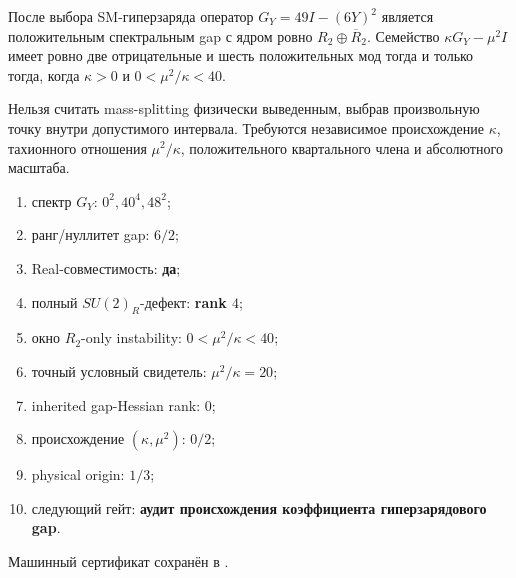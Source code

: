 \begin{theorem}
После выбора SM-гиперзаряда оператор $G_Y=49I-(6Y)^2$ является
положительным спектральным gap с ядром ровно
$R_2\oplus\overline R_2$. Семейство
$\kappa G_Y-\mu^2I$ имеет ровно две отрицательные и шесть положительных
мод тогда и только тогда, когда $\kappa>0$ и
$0<\mu^2/\kappa<40$.
\end{theorem}

\begin{nogocriterion}
Нельзя считать mass-splitting физически выведенным, выбрав произвольную
точку внутри допустимого интервала. Требуются независимое происхождение
$\kappa$, тахионного отношения $\mu^2/\kappa$, положительного квартального
члена и абсолютного масштаба.
\end{nogocriterion}

\begin{protocol}\begin{enumerate}
\item спектр $G_Y$: \textbf{$0^2,40^4,48^2$};
\item ранг/нуллитет gap: \textbf{$6/2$};
\item Real-совместимость: \textbf{да};
\item полный $SU(2)_R$-дефект: \textbf{rank $4$};
\item окно $R_2$-only instability: \textbf{$0<\mu^2/\kappa<40$};
\item точный условный свидетель: \textbf{$\mu^2/\kappa=20$};
\item inherited gap-Hessian rank: \textbf{$0$};
\item происхождение $(\kappa,\mu^2)$: \textbf{$0/2$};
\item physical origin: \textbf{$1/3$};
\item следующий гейт: \textbf{аудит происхождения коэффициента гиперзарядового gap}.
\end{enumerate}\end{protocol}

Машинный сертификат сохранён в
.